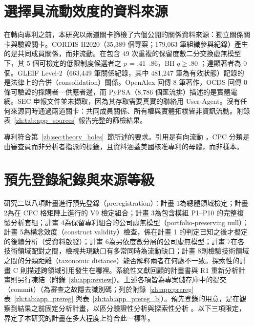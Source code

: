 \section{選擇具流動效度的資料來源}
\label{zh:sec:design_sources}

在轉向專利之前，本研究以兩道關卡篩檢了六個公開的關係資料來源：獨立關係關卡與驗證關卡。CORDIS H2020（35,389 個專案；179,063 筆組織參與紀錄）產生的是共同成員關係，而非流動。在包含 49 次重複的保留度數二分交換虛無模型下，其 5 個可檢定的低限制度候選者之 $p$ = .41--.86，BH $q \geq .80$ \citep{benjamini1995controlling}；達顯著者為 0 個。GLEIF Level-2（663,449 筆關係紀錄，其中 481,247 筆為有效狀態）記錄的是法律上的合併（consolidation）關係。OpenAlex 回傳 8 筆著作，OCDS 回傳 0 條可驗證的採購者—供應者邊，而 PyPSA（8,786 個匯流排）描述的是實體電網。SEC 申報文件並未擷取，因為其存取需要真實的聯絡用 User-Agent。沒有任何來源同時通過兩道關卡：共同成員關係、所有權與實體拓樸皆非資訊流動。附錄表~\ref{zh:tab:app_sources} 報告完整的篩檢結果。

專利符合第~\ref{zh:sec:theory_holes}~節所述的要求。引用是有向流動 \citep{jaffe1993geographic}，CPC 分類是由審查員而非分析者指派的標籤，且資料涵蓋美國核准專利的母體，而非樣本。

\section{預先登錄紀錄與來源等級}
\label{zh:sec:design_prereg}

研究二以八項計畫進行預先登錄（preregistration）：計畫 1為總體領域檢定；計畫 2為在 CPC 格矩陣上進行的 V9 檢定組合；計畫 3為包含模組 P1--P10 的完整複製分析套組；計畫 4為保留專利組合的公司虛無模型（portfolio-preserving null）；計畫 5為構念效度（construct validity）檢查，係在計畫 1 的判定已知之後才擬定的後續分析（受資料啟發）；計畫 6為另依度數分層的公司虛無模型；計畫 7在各技術領域配對之間，檢視共現缺口有多常同時為流動缺口；計畫 8則檢驗技術領域之間的分類距離（taxonomic distance）能否解釋兩者在何處不一致。探索性的計畫 C 則描述跨領域引用發生在哪裡。系統性文獻回顧的計畫書與 R1 重新分析計畫則另行凍結（附錄~\ref{zh:app:review}）。上述各項皆為專案儲存庫中的提交（commit）（為審查之故隱去識別碼；列於附錄~\ref{zh:app:prereg} 表~\ref{zh:tab:app_prereg} 與表~\ref{zh:tab:app_prereg_b}）。預先登錄的用意，是在觀察到結果之前固定分析計畫，以區分驗證性分析與探索性分析 \citep{nosek2018preregistration}。以下三項限定，界定了本研究的計畫在多大程度上符合此一標準。


